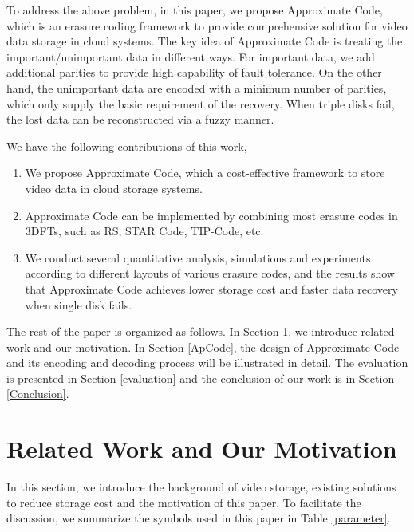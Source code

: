 \documentclass[sigconf]{acmart}
\begin{document}
To address the above problem, in this paper, we propose Approximate Code, which is an erasure coding framework to provide comprehensive solution for video data storage in cloud systems. The key idea of Approximate Code is treating the important/unimportant data in different ways. For important data, we add additional parities to provide high capability of fault tolerance. On the other hand, the unimportant data are encoded with a minimum number of parities, which only supply the basic requirement of the recovery. When triple disks fail, the lost data can be reconstructed via a fuzzy manner.

We have the following contributions of this work,
\begin{enumerate}
\item We propose Approximate Code, which a cost-effective framework to store video data in cloud storage systems.
\item Approximate Code can be implemented by combining most erasure codes in 3DFTs, such as RS, STAR Code, TIP-Code, etc.
\item We conduct several quantitative analysis, simulations and experiments according to different layouts of various erasure codes, and the results show that Approximate Code achieves lower storage cost and faster data recovery when single disk fails.
\end{enumerate}

The rest of the paper is organized as follows. In Section \ref{RelatedWork}, we introduce related work and our motivation. 
In Section \ref{ApCode}, the design of Approximate Code and its encoding and decoding process will be illustrated in detail. 
The evaluation is presented in Section \ref{evaluation} and the conclusion of our work is in Section \ref{Conclusion}. 

\section{Related Work and Our Motivation}\label{RelatedWork}
In this section, we introduce the background of video storage, existing solutions to reduce storage cost and the motivation of this paper.
To facilitate the discussion, we summarize the symbols used in this paper in Table \ref{parameter}.
\end{document}
